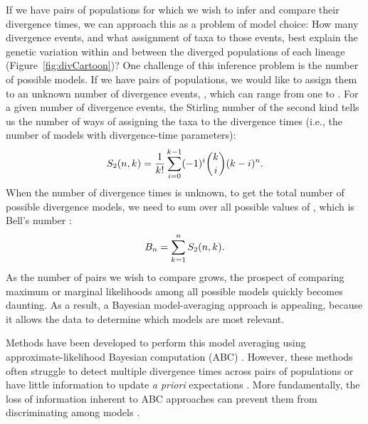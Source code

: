 \begin{linenomath}
If we have pairs of populations for which we wish to infer and compare their
divergence times, we can approach this as a problem of model choice:
How many divergence events, and what assignment of taxa to those events, best
explain the genetic variation within and between the diverged populations of
each lineage (Figure~\ref{fig:divCartoon})?
One challenge of this inference problem is the number of possible models.
If we have \ncomparisons{} pairs of populations, we would like to assign them to an
unknown number of divergence events, \nevents{}, which can range from one to
\ncomparisons{}.
For a given number of divergence events, the Stirling number of the second kind
tells us the number of ways of assigning the taxa to the divergence times
(i.e., the number of models with \nevents{} divergence-time parameters):
\begin{equation}
    S_2(n, k_{}) = 
    \frac{1}{k_{}!} \sum_{i = 0}^{k_{} - 1} (-1)^{i}
    \binom{k_{}}{i} (k_{} - i)^{n}.
    \label{eq:stirling2}
\end{equation}
When the number of divergence times is unknown, to get the total number of
possible divergence models, we need to sum over all possible values of
\nevents{}, which is Bell's number \citep{Bell1934}:
\begin{equation}
    B_{n} = \sum_{k_{} = 1}^{n}
    S_2(n, k_{}).
    \label{eq:bell}
\end{equation}
As the number of pairs we wish to compare grows, the prospect of comparing
maximum or marginal likelihoods among all possible models quickly becomes
daunting.
As a result, a Bayesian model-averaging approach is appealing, because it
allows the data to determine which models are most relevant.
\end{linenomath}

Methods have been developed to perform this model averaging using
approximate-likelihood Bayesian computation (ABC)
\citep{Hickerson2006,Huang2011,Oaks2014dpp}.
However, these methods often struggle to detect multiple divergence times
across pairs of populations \citep{Oaks2012, Oaks2014reply} or have little
information to update \emph{a priori} expectations \citep{Oaks2014dpp}.
More fundamentally, the loss of information inherent to ABC approaches can
prevent them from discriminating among models
\citep{Robert2011,Marin2014,Green2015}.

